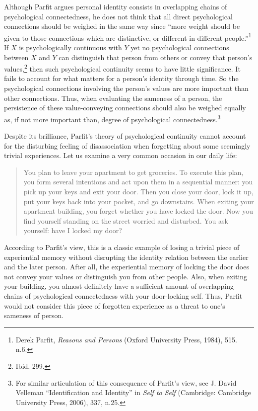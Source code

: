 Although Parfit argues personal identity consists in overlapping
chains of psychological connectedness, he does not think that all direct
psychological connections should be weighed in the same way since ``more
weight should be given to those connections which are distinctive, or
different in different people.''\footnote{Derek Parfit, \emph{Reasons
  and Persons} (Oxford University Press, 1984), 515. n.6.} If $X$ is
psychologically continuous with $Y$ yet no psychological connections
between $X$ and $Y$ can distinguish that person from others or convey that
person's values,\footnote{Ibid, 299.} then such psychological continuity
seems to have little significance. It fails to account for what matters
for a person's identity through time. So the psychological connections
involving the person's values are more important than other connections.
Thus, when evaluating the sameness of a person, the persistence of these
value-conveying connections should also be weighed equally as, if not
more important than, degree of psychological connectedness.\footnote{For
  similar articulation of this consequence of Parfit's view, see J.
  David Velleman ``Identification and Identity'' in \emph{Self to Self}
  (Cambridge: Cambridge University Press, 2006), 337, n.25.}

Despite its brilliance, Parfit's theory of psychological continuity
cannot account for the disturbing feeling of disassociation when
forgetting about some seemingly trivial experiences. Let us examine a
very common occasion in our daily life:

\begin{quote}
You plan to leave your apartment to get groceries. To execute this
plan, you form several intentions and act upon them in a sequential
manner: you pick up your keys and exit your door. Then you close
your door, lock it up, put your keys back into your pocket, and go
downstairs. When exiting your apartment building, you forget
whether you have locked the door. Now you find yourself standing
on the street worried and disturbed. You ask yourself: have I locked
my door?
\end{quote}
According to Parfit's view, this is a classic example of losing a
trivial piece of experiential memory without disrupting the identity
relation between the earlier and the later person. After all, the
experiential memory of locking the door does not convey your values or
distinguish you from other people. Also, when exiting your building, you
almost definitely have a sufficient amount of overlapping chains of
psychological connectedness with your door-locking self. Thus, Parfit
would not consider this piece of forgotten experience as a threat to
one's sameness of person.

